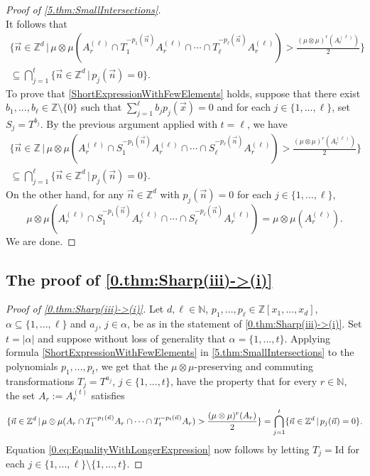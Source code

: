 \documentclass[11pt,american,preprint]{elsarticle}
\numberwithin{equation}{section}
\theoremstyle{plain}
\theoremstyle{plain*}
\theoremstyle{plain}
\theoremstyle{plain*}
\theoremstyle{plain}
\theoremstyle{plain*}
\theoremstyle{remark}
\theoremstyle{remark*}
\theoremstyle{remark}
\theoremstyle{remark*}
\theoremstyle{remark}
\theoremstyle{remark*}
\theoremstyle{plain}
\theoremstyle{definition}
\theoremstyle{plain}
\theoremstyle{plain} %
\newcommand{\N}{\mathbb{N}}
\newcommand{\Z}{\mathbb{Z}}
\begin{document}
\begin{proof}[Proof of \cref{5.thm:SmallIntersections}]
$$$$
It follows that 
\begin{multline}\label{eq:BoundedByDeg}
\{\vec n\in\Z^d\,|\,\mu\otimes\mu(A_r^{(\ell)}\cap T_1^{-p_1(\vec n)}A_r^{(\ell)}\cap\cdots\cap T_\ell^{- p_\ell(\vec n)}A_r^{(\ell)})> \frac{(\mu\otimes\mu)^r(A_r^{(\ell)})}{2}\}\\
\subseteq \bigcap_{j=1}^t\{\vec n\in\Z^d\,|\,p_j(\vec n)=0\}.
\end{multline}
To prove that  \eqref{ShortExpressionWithFewElements} holds, suppose that there exist $b_1,...,b_\ell\in\Z\setminus\{0\}$ such that $\sum_{j=1}^\ell b_jp_j(\vec x)=0$ and for each $j\in\{1,...,\ell\}$, set $S_j=T^{b_j}$. By the previous argument applied with $t=\ell$, we have  
\begin{multline*}
\{\vec n\in\Z\,|\,\mu\otimes\mu(A_r^{(\ell)}\cap S_1^{-p_1(\vec n)}A_r^{(\ell)}\cap\cdots\cap S_\ell^{- p_\ell(\vec n)}A_r^{(\ell)})>\frac{(\mu\otimes\mu)^r(A_r^{(\ell)})}{2}\}\\
\subseteq \bigcap_{j=1}^\ell \{\vec n\in\Z^d\,|\,p_j(\vec n)=0\}.
\end{multline*}
On the other hand,  for any $\vec n\in\Z^d$ with $p_j(\vec n)=0$ for each $j\in\{1,...,\ell\}$, 
$$
\mu\otimes\mu(A_r^{(\ell)}\cap S_1^{-p_1(\vec n)}A_r^{(\ell)}\cap\cdots\cap S_\ell^{- p_\ell(\vec n)}A_r^{(\ell)})=\mu\otimes\mu(A_r^{(\ell)}).
$$
We are done.  
\end{proof}
\subsection{The proof of \cref{0.thm:Sharp(iii)->(i)}}
\begin{proof}[Proof of \cref{0.thm:Sharp(iii)->(i)}]
Let $d,\ell\in\N$, $p_1,...,p_\ell\in\Z[x_1,...,x_d]$, $\alpha\subseteq \{1,...,\ell\}$ and $a_j$, $j\in\alpha$,  be as in the statement of \cref{0.thm:Sharp(iii)->(i)}. Set $t=|\alpha|$ and suppose without loss of generality that $\alpha=\{1,...,t\}$.  Applying formula \eqref{ShortExpressionWithFewElements} in  \cref{5.thm:SmallIntersections}  to the polynomials $p_1,...,p_t$, we get that the $\mu\otimes\mu$-preserving and commuting transformations $T_j=T^{a_j}$, $j\in\{1,...,t\}$, have the property that for every $r\in\N$, the set  $A_r:=A_{r}^{(t)}$ satisfies 
$$
\{\vec n\in\Z^d\,|\,\mu\otimes\mu(A_{r}\cap T_1^{-p_1(\vec n)}A_{r}\cap\cdots\cap T_t^{- p_t(\vec n)}A_{r})>\frac{(\mu\otimes\mu)^r(A_{r})}{2}\}\\
=\bigcap_{j=1}^t \{\vec n\in\Z^d\,|\,p_j(\vec n)=0\}.
$$
Equation  \ref{0.eq:EqualityWithLongerExpression} now follows by letting $T_j=\text{Id}$ for each $j\in\{1,...,\ell\}\setminus\{1,...,t\}$. 
\end{proof}
\end{document}
